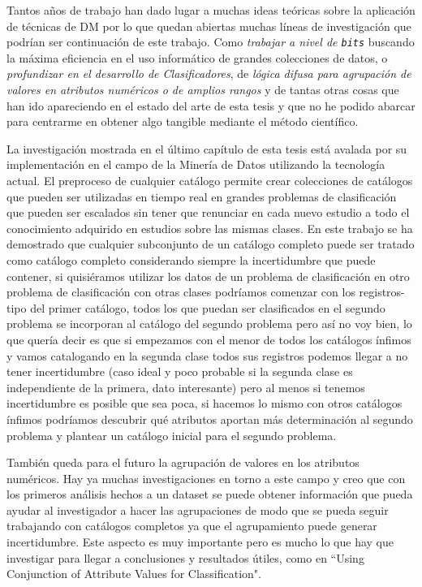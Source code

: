 
Tantos años de trabajo han dado lugar a muchas ideas teóricas sobre la aplicación de técnicas de DM por lo que quedan abiertas muchas líneas de investigación que podrían ser continuación de este trabajo. Como \emph{trabajar a nivel de \texttt{bits}} buscando la máxima eficiencia en el uso informático de grandes colecciones de datos, o \emph{profundizar en el desarrollo de Clasificadores}, de \emph{lógica difusa para agrupación de valores en atributos numéricos o de amplios rangos} y de tantas otras cosas que han ido apareciendo en el estado del arte de esta tesis y que no he podido abarcar para centrarme en obtener algo tangible mediante el método científico.

La investigación mostrada en el último capítulo de esta tesis está avalada por su implementación en el campo de la Minería de Datos utilizando la tecnología actual.
El preproceso de cualquier catálogo permite crear colecciones de catálogos que pueden ser utilizadas en tiempo real en grandes problemas de clasificación que pueden ser escalados sin tener que renunciar en cada nuevo estudio a todo el conocimiento adquirido en estudios sobre las mismas clases. En este trabajo se ha demostrado que cualquier subconjunto de un catálogo completo puede ser tratado como catálogo completo considerando siempre la incertidumbre que puede contener, si quisiéramos utilizar los datos de un problema de clasificación en otro problema de clasificación con otras clases podríamos comenzar con los registros-tipo del primer catálogo, todos los que puedan ser clasificados en el segundo problema se incorporan al catálogo del segundo problema pero así no  voy bien, lo que quería decir es que si empezamos con el menor de todos los catálogos ínfimos y vamos catalogando en la segunda clase todos sus registros podemos llegar a no tener incertidumbre (caso ideal y poco probable si la segunda clase es independiente de la primera, dato interesante) pero al menos si tenemos incertidumbre es posible que sea poca, si hacemos lo mismo con otros catálogos ínfimos podríamos descubrir qué atributos aportan más determinación al segundo problema y plantear un catálogo inicial para el segundo problema.

También queda para el futuro la agrupación de valores en los atributos numéricos. Hay ya muchas investigaciones en torno a este campo y creo que con los primeros análisis hechos a un dataset se puede obtener información que pueda ayudar al investigador a hacer las agrupaciones de modo que se pueda seguir trabajando con catálogos completos ya que el agrupamiento puede generar incertidumbre. Este aspecto es muy importante pero es mucho lo que hay que investigar para llegar a conclusiones y resultados útiles, como en ``Using Conjunction of Attribute Values for Classification".

